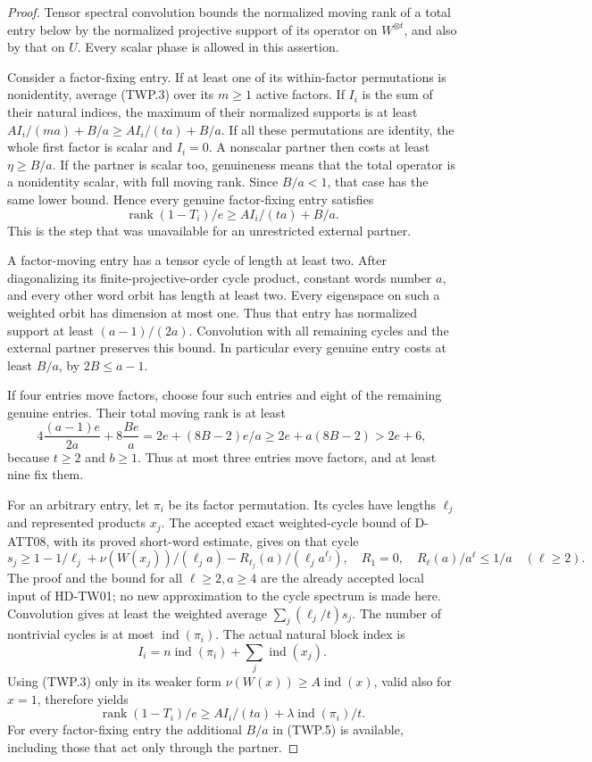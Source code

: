 \begin{proof}
Tensor spectral convolution bounds the normalized moving rank of a total
entry below by the normalized projective support of its operator on
\(W^{\otimes t}\), and also by that on \(U\). Every scalar phase is
allowed in this assertion.

Consider a factor-fixing entry. If at least one of its within-factor
permutations is nonidentity, average (TWP.3) over its \(m\ge1\) active
factors. If \(I_i\) is the sum of their natural indices, the maximum
of their normalized supports is at least
\(AI_i/(ma)+B/a\ge AI_i/(ta)+B/a\).
If all these permutations are identity, the whole first factor is scalar
and \(I_i=0\). A nonscalar partner then costs at least \(\eta\ge B/a\).
If the partner is scalar too, genuineness means that the total operator
is a nonidentity scalar, with full moving rank. Since \(B/a<1\), that
case has the same lower bound. Hence every genuine factor-fixing entry
satisfies
\[
       \operatorname{rank}(1-T_i)/e\ge AI_i/(ta)+B/a.
       \tag{TWP.5}
\]
This is the step that was unavailable for an unrestricted external partner.

A factor-moving entry has a tensor cycle of length at least two. After
diagonalizing its finite-projective-order cycle product, constant words
number \(a\), and every other word orbit has length at least two.
Every eigenspace on such a weighted orbit has dimension at most one.
Thus that entry has normalized support at least \((a-1)/(2a)\).
Convolution with all remaining cycles and the external partner preserves
this bound. In particular every genuine entry costs at least \(B/a\),
by \(2B\le a-1\).

If four entries move factors, choose four such entries and eight of the
remaining genuine entries. Their total moving rank is at least
\[
       4\frac{(a-1)e}{2a}+8\frac{Be}{a}
         =2e+(8B-2)e/a
         \ge2e+a(8B-2)>2e+6,
         \tag{TWP.6}
\]
because \(t\ge2\) and \(b\ge1\). Thus at most three entries move
factors, and at least nine fix them.

For an arbitrary entry, let \(\pi_i\) be its factor permutation.
Its cycles have lengths \(\ell_j\) and represented products \(x_j\).
The accepted exact weighted-cycle bound of D-ATT08, with its proved
short-word estimate, gives on that cycle
\[
 s_j\ge1-1/\ell_j+
       \nu(W(x_j))/(\ell_j a)
       -R_{\ell_j}(a)/(\ell_j a^{\ell_j}),
 \quad R_1=0,\quad
 R_\ell(a)/a^\ell\le1/a\quad(\ell\ge2).
 \tag{TWP.7}
\]
The proof and the bound for all \(\ell\ge2,a\ge4\) are the
already accepted local input of HD-TW01; no new approximation to
the cycle spectrum is made here. Convolution gives at least the
weighted average \(\sum_j(\ell_j/t)s_j\).
The number of nontrivial cycles is at most \(\operatorname{ind}(\pi_i)\).
The actual natural block index is
\[
 I_i=n\operatorname{ind}(\pi_i)+\sum_j\operatorname{ind}(x_j).
 \tag{TWP.8}
\]
Using (TWP.3) only in its weaker form
\(\nu(W(x))\ge A\operatorname{ind}(x)\), valid also for \(x=1\),
therefore yields
\[
 \operatorname{rank}(1-T_i)/e
       \ge AI_i/(ta)+\lambda\operatorname{ind}(\pi_i)/t.
 \tag{TWP.9}
\]
For every factor-fixing entry the additional \(B/a\) in (TWP.5)
is available, including those that act only through the partner.


\end{proof}
